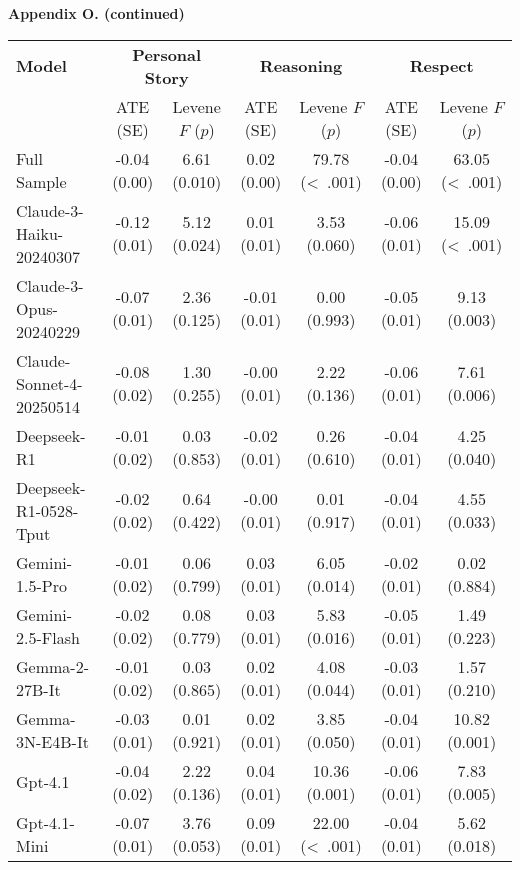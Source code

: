 \documentclass[11pt]{article}
\begin{document}
\begin{landscape}
\noindent\textbf{Appendix O. (continued)}

\vspace{1em}
{\small
\renewcommand{\arraystretch}{1.2}
\begin{tabular}{l c c c c c c}
\toprule
\textbf{Model} & \multicolumn{2}{c}{\textbf{Personal Story}} & \multicolumn{2}{c}{\textbf{Reasoning}} & \multicolumn{2}{c}{\textbf{Respect}} \\
 & ATE (SE) & Levene $F$ ($p$) & ATE (SE) & Levene $F$ ($p$) & ATE (SE) & Levene $F$ ($p$) \\
\midrule
Full Sample & -0.04 (0.00) & 6.61 (0.010) & 0.02 (0.00) & 79.78 (\textless\ .001) & -0.04 (0.00) & 63.05 (\textless\ .001) \\
\addlinespace[0.5em]
Claude-3-Haiku-20240307 & -0.12 (0.01) & 5.12 (0.024) & 0.01 (0.01) & 3.53 (0.060) & -0.06 (0.01) & 15.09 (\textless\ .001) \\
\addlinespace[0.5em]
Claude-3-Opus-20240229 & -0.07 (0.01) & 2.36 (0.125) & -0.01 (0.01) & 0.00 (0.993) & -0.05 (0.01) & 9.13 (0.003) \\
\addlinespace[0.5em]
Claude-Sonnet-4-20250514 & -0.08 (0.02) & 1.30 (0.255) & -0.00 (0.01) & 2.22 (0.136) & -0.06 (0.01) & 7.61 (0.006) \\
\addlinespace[0.5em]
Deepseek-R1 & -0.01 (0.02) & 0.03 (0.853) & -0.02 (0.01) & 0.26 (0.610) & -0.04 (0.01) & 4.25 (0.040) \\
\addlinespace[0.5em]
Deepseek-R1-0528-Tput & -0.02 (0.02) & 0.64 (0.422) & -0.00 (0.01) & 0.01 (0.917) & -0.04 (0.01) & 4.55 (0.033) \\
\addlinespace[0.5em]
Gemini-1.5-Pro & -0.01 (0.02) & 0.06 (0.799) & 0.03 (0.01) & 6.05 (0.014) & -0.02 (0.01) & 0.02 (0.884) \\
\addlinespace[0.5em]
Gemini-2.5-Flash & -0.02 (0.02) & 0.08 (0.779) & 0.03 (0.01) & 5.83 (0.016) & -0.05 (0.01) & 1.49 (0.223) \\
\addlinespace[0.5em]
Gemma-2-27B-It & -0.01 (0.02) & 0.03 (0.865) & 0.02 (0.01) & 4.08 (0.044) & -0.03 (0.01) & 1.57 (0.210) \\
\addlinespace[0.5em]
Gemma-3N-E4B-It & -0.03 (0.01) & 0.01 (0.921) & 0.02 (0.01) & 3.85 (0.050) & -0.04 (0.01) & 10.82 (0.001) \\
\addlinespace[0.5em]
Gpt-4.1 & -0.04 (0.02) & 2.22 (0.136) & 0.04 (0.01) & 10.36 (0.001) & -0.06 (0.01) & 7.83 (0.005) \\
\addlinespace[0.5em]
Gpt-4.1-Mini & -0.07 (0.01) & 3.76 (0.053) & 0.09 (0.01) & 22.00 (\textless\ .001) & -0.04 (0.01) & 5.62 (0.018) \\

\end{tabular}}
\end{landscape}
\end{document}
